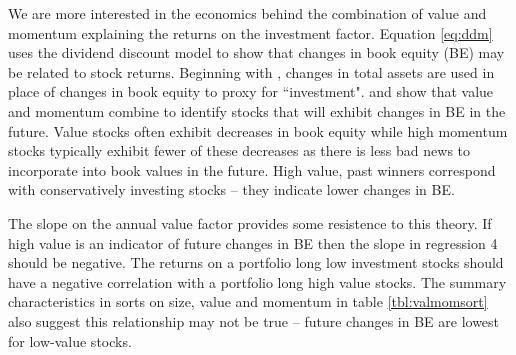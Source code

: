 We are more interested in the economics behind the combination of value and momentum
explaining the returns on the investment factor. Equation \ref{eq:ddm} uses the dividend
discount model to show that changes in book equity (BE) may be related to stock returns.
Beginning with \textcite{fama2006profitability}, changes in total assets are used in place
of changes in book equity to proxy for ``investment". \textcite{kok2017facts} and
\textcite{asness2013devil} show that value and momentum combine to identify stocks that
will exhibit changes in BE in the future. Value stocks often exhibit decreases in book
equity while high momentum stocks typically exhibit fewer of these decreases as there is
less bad news to incorporate into book values in the future. High value, past winners
correspond with conservatively investing stocks -- they indicate lower changes in BE.

The slope on the annual value factor provides some resistence to this theory. If high
value is an indicator of future changes in BE then the slope in regression 4 should be
negative. The returns on a portfolio long low investment stocks should have a negative
correlation with a portfolio long high value stocks. The summary characteristics in sorts
on size, value and momentum in table \ref{tbl:valmomsort} also suggest this
relationship may not be true -- future changes in BE are lowest for low-value stocks.




